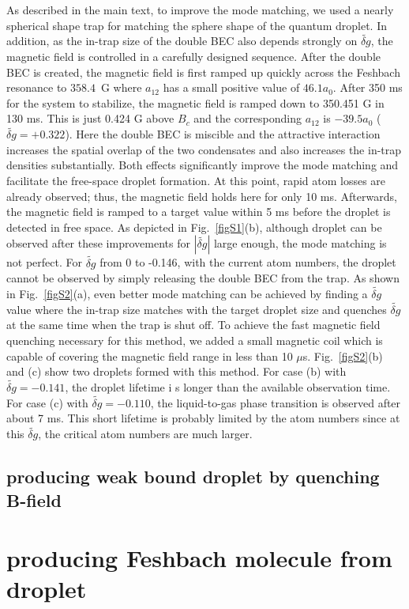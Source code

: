 As described in the main text, to improve the mode matching, we used a nearly spherical shape trap for matching the sphere shape of the quantum droplet.
In addition, as the in-trap size of the double BEC also depends strongly on $\widetilde{\delta g}$, the magnetic field is controlled in a carefully designed sequence. After the double BEC is created, the magnetic field is first ramped up quickly across the Feshbach resonance to $358.4$~G where $a_{12}$ has a small positive value of $46.1a_0$.
After 350 ms for the system to stabilize, the magnetic field is ramped down to 350.451 G in 130 ms.
This is just 0.424 G above $B_c$ and the corresponding $a_{12}$ is $-39.5a_0$ ($\widetilde{\delta g} = +0.322$).
Here the double BEC is miscible and the attractive interaction increases the spatial overlap of the two condensates and also increases the in-trap 
densities substantially. Both effects significantly improve the mode matching and facilitate the free-space droplet formation.
At this point, rapid atom losses are already observed; thus, the magnetic 
field holds here for only 10 ms.
Afterwards, the magnetic field is ramped to a target value within 5 ms before the droplet is detected in free space.
As depicted in Fig.~\ref{figS1}(b), although droplet can be observed after these improvements for $|\widetilde{\delta g}|$ large enough, the mode matching is not perfect. For $\widetilde{\delta g}$ from 0 to -0.146, with the current atom numbers, the droplet cannot be observed by simply releasing the double BEC from the trap. As shown in Fig.~\ref{figS2}(a), even 
better mode matching can be achieved by finding a $\widetilde{\delta g}$ value where the in-trap size matches with the target droplet size and quenches $\widetilde{\delta g}$ at the same time when the trap is shut off. To achieve the fast magnetic field quenching necessary for this method, we added a small magnetic coil which is capable of covering the magnetic field range in less than 10 $\mu$s. Fig.~\ref{figS2}(b) and (c) show two droplets formed with this method. For case (b) with $\widetilde{\delta g} = -0.141$, the droplet lifetime i
s longer than the available observation time. For case (c) with $\widetilde{\delta g} = -0.110$, the liquid-to-gas phase transition is observed after about 7 ms. This short lifetime is probably limited by the atom numbers since at this $\widetilde{\delta g}$, the critical atom numbers are much larger.


\subsection{producing weak bound droplet by quenching B-field}


\section{producing Feshbach molecule from droplet}
\label{sec:droplet_molecule}